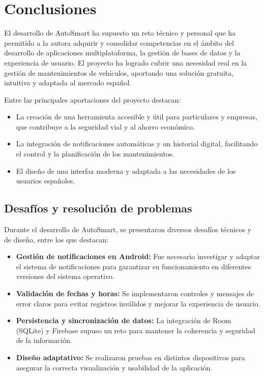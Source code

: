 \chapter{Conclusiones}

El desarrollo de AutoSmart ha supuesto un reto técnico y personal que ha permitido a la autora adquirir y consolidar competencias en el ámbito del desarrollo de aplicaciones multiplataforma, la gestión de bases de datos y la experiencia de usuario. El proyecto ha logrado cubrir una necesidad real en la gestión de mantenimientos de vehículos, aportando una solución gratuita, intuitiva y adaptada al mercado español.

Entre las principales aportaciones del proyecto destacan:
\begin{itemize}
    \item La creación de una herramienta accesible y útil para particulares y empresas, que contribuye a la seguridad vial y al ahorro económico.
    \item La integración de notificaciones automáticas y un historial digital, facilitando el control y la planificación de los mantenimientos.
    \item El diseño de una interfaz moderna y adaptada a las necesidades de los usuarios españoles.
\end{itemize}

\section*{Desafíos y resolución de problemas}
Durante el desarrollo de AutoSmart, se presentaron diversos desafíos técnicos y de diseño, entre los que destacan:
\begin{itemize}
    \item \textbf{Gestión de notificaciones en Android:} Fue necesario investigar y adaptar el sistema de notificaciones para garantizar su funcionamiento en diferentes versiones del sistema operativo.
    \item \textbf{Validación de fechas y horas:} Se implementaron controles y mensajes de error claros para evitar registros inválidos y mejorar la experiencia de usuario.
    \item \textbf{Persistencia y sincronización de datos:} La integración de Room (SQLite) y Firebase supuso un reto para mantener la coherencia y seguridad de la información.
    \item \textbf{Diseño adaptativo:} Se realizaron pruebas en distintos dispositivos para asegurar la correcta visualización y usabilidad de la aplicación.
\end{itemize}

